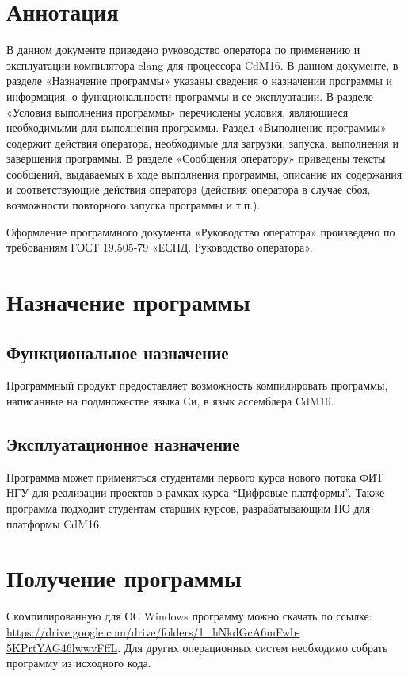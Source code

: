 \documentclass[a4paper,14pt]{extarticle}
\begin{document}
\section{Аннотация}
В данном документе приведено руководство оператора по применению и эксплуатации компилятора clang для процессора CdM16. В данном документе, в разделе «Назначение программы» указаны сведения о назначении программы и информация, о функциональности программы и ее эксплуатации. В разделе «Условия выполнения программы» перечислены условия, являющиеся необходимыми для выполнения программы. Раздел «Выполнение программы» содержит действия оператора, необходимые для загрузки, запуска, выполнения и завершения программы. В разделе «Сообщения оператору» приведены тексты сообщений, выдаваемых в ходе выполнения программы, описание их содержания и соответствующие действия оператора (действия оператора в случае сбоя, возможности повторного запуска программы и т.п.).

Оформление программного документа «Руководство оператора» произведено по требованиям ГОСТ 19.505-79 «ЕСПД. Руководство оператора».

\newpage 
\section{Назначение программы}
\subsection{Функциональное назначение}
Программный продукт предоставляет возможность компилировать программы, написанные на подмножестве языка Си, в язык ассемблера CdM16.
\subsection{Эксплуатационное назначение}
Программа может применяться студентами первого курса нового потока ФИТ НГУ для реализации проектов в рамках курса “Цифровые платформы”. Также программа подходит студентам старших курсов, разрабатывающим ПО для платформы CdM16.
\section{Получение программы}
Скомпилированную для ОС Windows программу можно скачать по ссылке: \href{https://drive.google.com/drive/folders/1_hNkdGcA6mFwb-5KPrtYAG46lwwvFffL}{https://drive.google.com/drive/folders/1\_hNkdGcA6mFwb-5KPrtYAG46lwwvFffL}. Для других операционных систем необходимо собрать программу из исходного кода.
\end{document}
